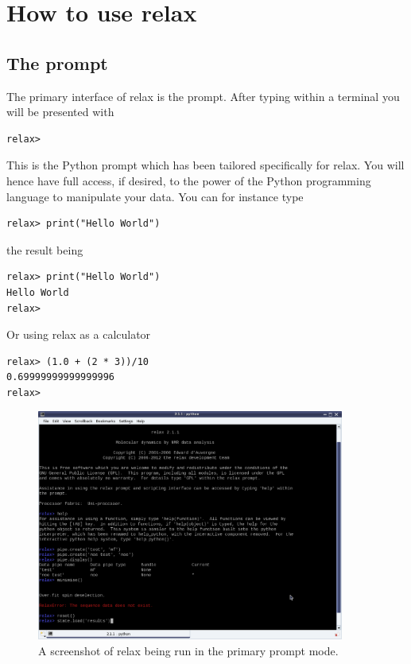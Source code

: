 
\section{How to use relax}



\subsection{The prompt}

The primary interface of relax is the prompt.  After typing  within a terminal you will be presented with

\begin{lstlisting}[numbers=none]
relax>
\end{lstlisting}

This is the Python prompt which has been tailored specifically for relax.  You will hence have full access, if desired, to the power of the Python programming language to manipulate your data.  You can for instance type

\begin{lstlisting}[numbers=none]
relax> print("Hello World")
\end{lstlisting}

the result being

\begin{lstlisting}[numbers=none]
relax> print("Hello World")
Hello World
relax>
\end{lstlisting}

Or using relax as a calculator

\begin{lstlisting}[numbers=none]
relax> (1.0 + (2 * 3))/10
0.69999999999999996
relax>
\end{lstlisting}

\begin{figure}
\centerline{\includegraphics[width=0.9\textwidth, bb=14 14 1088 821]{graphics/screenshots/relax_prompt_mode}}
\caption[Prompt screenshot]{A screenshot of relax being run in the primary prompt mode.}\label{fig: relax prompt}
\end{figure}



